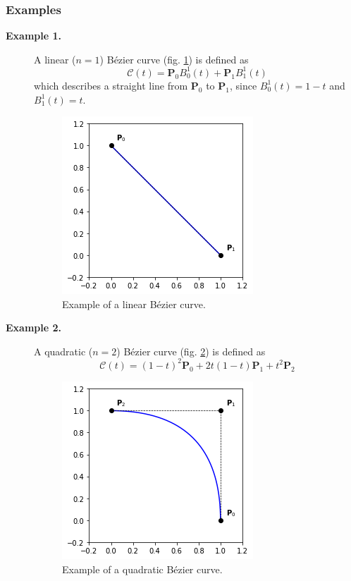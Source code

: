 \subsubsection*{Examples}
\begin{description}
  \item[\textbf{Example 1.}] A linear ($n=1$) B\'ezier curve (fig. \ref{fig:bezier-ex1}) is defined as 
    $$\mathcal{C}(t) = \mathbf{P}_0 B_0^1(t) + \mathbf{P}_1 B_1^1(t)$$ 
    which describes a straight line from $\mathbf{P}_0$ to $\mathbf{P}_1$, since $B_0^1(t) = 1-t$ and $B_1^1(t) = t$. 

  \begin{figure}
  \centering
  \includegraphics[width=.6\textwidth]{figures/cad/bezier/ex1}
  \caption{Example of a linear B\'ezier curve.}
  \label{fig:bezier-ex1}
  \end{figure}

  \item[\textbf{Example 2.}] A quadratic ($n=2$) B\'ezier curve (fig. \ref{fig:bezier-ex2}) is defined as 
    $$\mathcal{C}(t) = (1-t)^2 \mathbf{P}_0  + 2t(1-t) \mathbf{P}_1 + t^2 \mathbf{P}_2$$  

  \begin{figure}
  \centering
  \includegraphics[width=.6\textwidth]{figures/cad/bezier/ex2}
  \caption{Example of a quadratic B\'ezier curve.}
  \label{fig:bezier-ex2}
  \end{figure}


\end{description}

